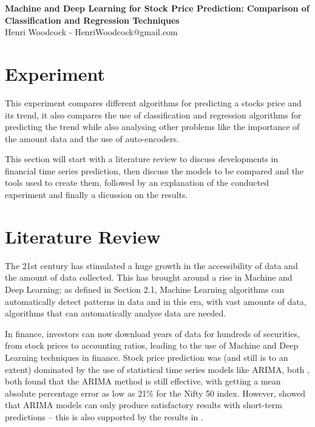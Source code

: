 \documentclass[11pt,a4paper]{article}
\numberwithin{equation}{section}
\begin{document}
\thispagestyle{plain}
\begin{center}
{\bf \huge Machine and Deep Learning for Stock Price Prediction: Comparison of Classification and Regression Techniques}
\vspace{4mm} \\
{Henri Woodcock - HenriWoodcock@gmail.com}
\end{center}

\tableofcontents

\noindent \hrulefill

\section{Experiment}
\label{s:exp}
This experiment compares different algorithms for predicting a stocks price and its trend, it also compares the use of classification and regression algorithms for predicting the trend while also analysing other problems like the importance of the amount data and the use of auto-encoders.

This section will start with a literature review to discuss developments in financial time series prediction, then discuss the models to be compared and the tools used to create them, followed by an explanation of the conducted experiment and finally a dicussion on the results.
\section{Literature Review}
\label{lit:rev}
The 21st century has stimulated a huge growth in the accessibility of data and the amount of data collected. This has brought around a rise in Machine and Deep Learning; as defined in Section 2.1, Machine Learning algorithms can automatically detect patterns in data and in this era, with vast amounts of data, algorithms that can automatically analyse data are needed.

In finance, investors can now download years of data for hundreds of securities, from stock prices to accounting ratios, leading to the use of Machine and Deep Learning techniques in finance. Stock price prediction was (and still is to an extent) dominated by the use of statistical time series models like ARIMA, both \cite{devi2013},\cite{ade2014} both found that the ARIMA method is still effective, with \cite{devi2013} getting a mean absolute percentage error as low as 21\% for the Nifty 50 index. However, \cite{ade2014} showed that ARIMA models can only produce satisfactory results with short-term predictions – this is also supported by the results in \cite{ho2002}.
\end{document}
